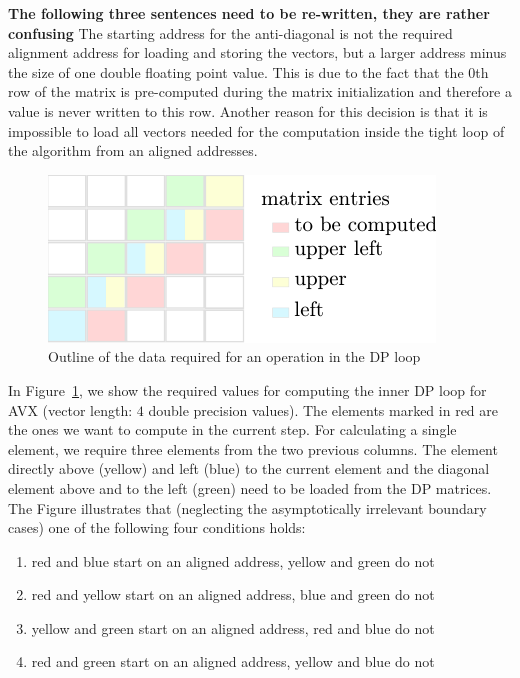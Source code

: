 \documentclass[runningheads,a4paper]{llncs}
\begin{document}
{\bf The following three sentences need to be re-written, they are rather confusing} The starting address for the anti-diagonal is not the required alignment address for loading and storing the vectors, but a larger address minus the size of one double floating point value. 
This is due to the fact that the 0th row of the matrix is pre-computed during the matrix initialization and therefore a value is never written to this row. Another reason for this decision is that it is impossible to load all vectors needed for the computation inside the tight loop of the algorithm from an aligned addresses.

\begin{figure}[ht!]
  \centering
  \includegraphics[scale=1.1]{figures/alignment.pdf}
  \caption{Outline of the data required for an operation in the DP loop}
  \label{fig:alignment}
\end{figure}

In Figure~\ref{fig:alignment}, we show the required values for computing the inner DP loop for AVX (vector length: $4$ double precision values). 
The elements marked in red are the ones we want to compute in the current step. 
For calculating a single element, we require three elements from the two previous columns. 
The element directly above (yellow) and left (blue) to the current element and the diagonal element above and to the left  (green) need to be loaded from the DP matrices. 
The Figure illustrates that (neglecting the asymptotically irrelevant boundary cases) one of the following four conditions holds:
\begin{enumerate}
  \item red and blue start on an aligned address, yellow and green do not
  \item red and yellow start on an aligned address, blue and green do not
  \item yellow and green start on an aligned address, red and blue do not
  \item red and green start on an aligned address, yellow and blue do not
\end{enumerate}
\end{document}
